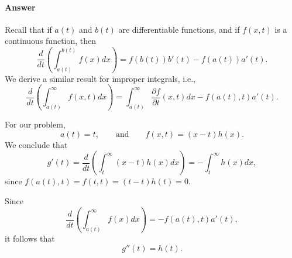 \paragraph{Answer}
Recall that if $ a(t) $ and $ b(t) $ are differentiable functions, and if
$ f(x, t) $ is a continuous function, then
\begin{equation*}
    \frac{d}{dt} \left( \int_{a(t)}^{b(t)} f(x) dx \right) =
        f(b(t)) b'(t) - f(a(t)) a'(t).
\end{equation*}
We derive a similar result for improper integrals, i.e.,
\begin{equation*}
    \frac{d}{dt} \left( \int_{a(t)}^{\infty} f(x, t) dx \right) =
        \int_{a(t)}^{\infty} \frac{\partial f}{\partial t} (x, t) dx -
        f(a(t), t) a'(t).
\end{equation*}

For our problem,
\begin{equation*}
    a(t) = t, \qquad \text{and} \qquad f(x, t) = (x - t) h(x).
\end{equation*}
We conclude that
\begin{equation*}
    g'(t) = \frac{d}{dt} \left( \int_{t}^{\infty} (x - t) h(x) dx \right) =
        -\int_{t}^{\infty} h(x) dx,
\end{equation*}
since $ f(a(t), t) = f(t, t) = (t - t)h(t) = 0 $.

Since
\begin{equation*}
    \frac{d}{dt} \left( \int_{a(t)}^{\infty} f(x) dx \right) =
        -f(a(t), t) a'(t),
\end{equation*}
it follows that
\begin{equation*}
    g''(t) = h(t).
\end{equation*}
